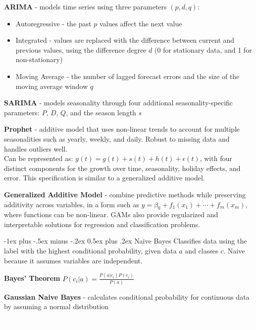 \documentclass[10pt,landscape]{article}
\makeatletter
\renewcommand{\section}{\@startsection{section}{1}{0mm}%
                                {-1ex plus -.5ex minus -.2ex}%
                                {0.5ex plus .2ex}%
                                {\normalfont\large\bfseries}}
\makeatother
\begin{document}
\begin{multicols}{3}
\textbf{ARIMA} - models time series using three parameters $(p,d,q)$:
\begin{itemize}[label={--},leftmargin=4mm]
\itemsep -.4mm
\item Autoregressive - the past $p$ values affect the next value

\item Integrated - values are replaced with the difference between current and previous values, using the difference degree $d$ (0 for stationary data, and 1 for non-stationary)

\item Moving Average - the number of lagged forecast errors and the size of the moving average window $q$
\end{itemize}

\textbf{SARIMA} - models seasonality through four additional seasonality-specific parameters: $P$, $D$, $Q$, and the season length $s$
\smallskip

\textbf{Prophet} - additive model that uses non-linear trends to account for multiple seasonalities such as yearly, weekly, and daily. Robust to missing data and handles outliers well.\\ Can be represented as: $y(t) = g(t) + s(t) + h(t) + \epsilon(t)$, with four distinct components for the growth over time, seasonality, holiday effects, and error. This specification is similar to a generalized additive model.
\smallskip

\textbf{Generalized Additive Model} - combine predictive methods while preserving additivity across variables, in a form such as
$y = \beta_0 + f_1(x_1) + \cdots + f_m(x_m)$, where functions can be non-linear. GAMs also provide regularized and interpretable solutions for regression and classification problems.

\section{Naive Bayes}
Classifies data using the label with the highest conditional probability, given data $a$ and classes $c$. Naive because it assumes variables are independent.

\textbf{Bayes' Theorem} $ P({c_i}|{a})  = \frac{P({a}|{c_i})P({c_i})}{P({a})}$

\textbf{Gaussian Naive Bayes} - calculates conditional probability for continuous data by assuming a normal distribution

\columnbreak
\textcolor{white}{.}\vspace{-5mm}\\ %

\end{multicols}
\end{document}
